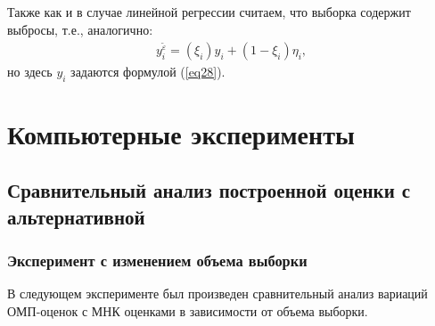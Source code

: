 Также как и в случае линейной регрессии считаем, что выборка содержит выбросы, т.е., аналогично:
\begin{eqnarray}
    y_i^{\widetilde{\varepsilon}}=(\xi_i)y_i+ (1-\xi_i)\eta_i,
\end{eqnarray}
но здесь $y_i$ задаются формулой (\ref{eq28}).

\newpage
\section{Компьютерные эксперименты}

\subsection{Сравнительный анализ построенной оценки с альтернативной}
\subsubsection{Эксперимент с изменением объема выборки}
В следующем эксперименте был произведен сравнительный анализ вариаций ОМП-оценок с МНК оценками в зависимости от объема выборки.

